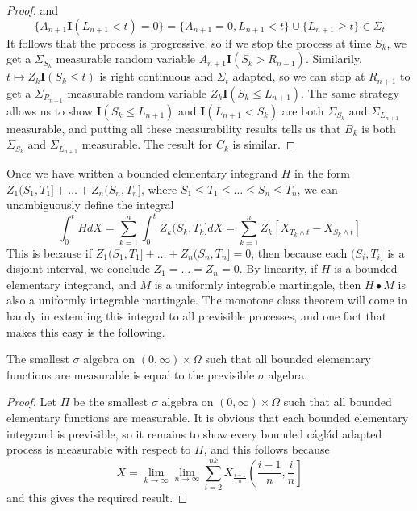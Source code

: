 \begin{proof}
    and
    \[ \{ A_{n+1} \mathbf{I}(L_{n+1} < t) = 0 \} = \{ A_{n+1} = 0, L_{n+1} < t \} \cup \{ L_{n+1} \geq t \} \in \Sigma_t \]
    It follows that the process is progressive, so if we stop the process at time $S_k$, we get a $\Sigma_{S_k}$ measurable random variable $A_{n+1} \mathbf{I}(S_k > R_{n+1})$. Similarily, $t \mapsto Z_k \mathbf{I}(S_k \leq t)$ is right continuous and $\Sigma_t$ adapted, so we can stop at $R_{n+1}$ to get a $\Sigma_{R_{n+1}}$ measurable random variable $Z_k \mathbf{I}(S_k \leq L_{n+1})$. The same strategy allows us to show $\mathbf{I}(S_k \leq L_{n+1})$ and $\mathbf{I}(L_{n+1} < S_k)$ are both $\Sigma_{S_k}$ and $\Sigma_{L_{n+1}}$ measurable, and putting all these measurability results tells us that $B_k$ is both $\Sigma_{S_k}$ and $\Sigma_{L_{n+1}}$ measurable. The result for $C_k$ is similar.
\end{proof}

Once we have written a bounded elementary integrand $H$ in the form $Z_1(S_1,T_1] + \dots + Z_n(S_n,T_n]$, where $S_1 \leq T_1 \leq \dots \leq S_n \leq T_n$, we can unambiguously define the integral
%
\[ \int_0^t HdX = \sum_{k = 1}^n \int_0^t Z_k(S_k,T_k] dX = \sum_{k = 1}^n Z_k[X_{T_k \wedge t} - X_{S_k \wedge t}] \]
%
This is because if $Z_1(S_1,T_1] + \dots + Z_n(S_n,T_n] = 0$, then because each $(S_i,T_i]$ is a disjoint interval, we conclude $Z_1 = \dots = Z_n = 0$. By linearity, if $H$ is a bounded elementary integrand, and $M$ is a uniformly integrable martingale, then $H \bullet M$ is also a uniformly integrable martingale. The monotone class theorem will come in handy in extending this integral to all previsible processes, and one fact that makes this easy is the following.

\begin{lemma}
    The smallest $\sigma$ algebra on $(0,\infty) \times \Omega$ such that all bounded elementary functions are measurable is equal to the previsible $\sigma$ algebra.
\end{lemma}
\begin{proof}
    Let $\Pi$ be the smallest $\sigma$ algebra on $(0,\infty) \times \Omega$ such that all bounded elementary functions are measurable. It is obvious that each bounded elementary integrand is previsible, so it remains to show every bounded c\'{a}gl\'{a}d adapted process is measurable with respect to $\Pi$, and this follows because
    \[ X = \lim_{k \to \infty} \lim_{n \to \infty} \sum_{i = 2}^{nk} X_{\frac{i-1}{n}} \left( \frac{i-1}{n}, \frac{i}{n} \right] \]
    and this gives the required result.
\end{proof}


